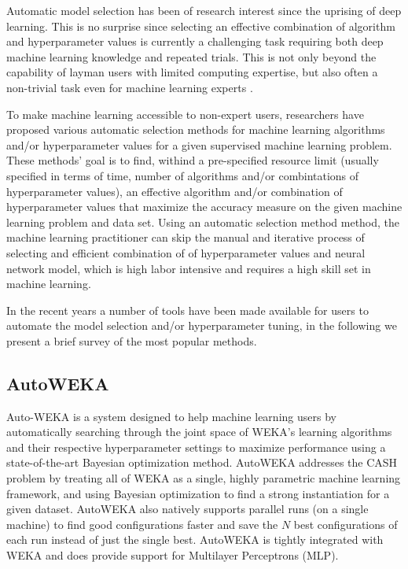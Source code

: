 \documentclass{article}
\begin{document}
Automatic model selection has been of research interest since the uprising of deep learning. This is no surprise since selecting an effective combination of algorithm and hyperparameter values is currently a challenging task requiring both deep machine learning knowledge and repeated trials. This is not only beyond the capability of layman users with limited computing expertise, but also often a non-trivial task even for machine learning experts \cite{sparks2015}. 

To make machine learning accessible to non-expert users, researchers have proposed various automatic selection methods for machine learning algorithms and/or hyperparameter values for a given supervised machine learning problem. These methods' goal is to find, withind a pre-specified resource limit (usually specified in terms of time, number of algorithms and/or combintations of hyperparameter values), an effective algorithm and/or combination of hyperparameter values that maximize the accuracy measure on the given machine learning problem and data set. Using an automatic selection method method, the machine learning practitioner can skip the manual and iterative process of selecting and efficient combination of of hyperparameter values and neural network model, which is high labor intensive and requires a high skill set in machine learning.

In the recent years a number of tools have been made available for users to automate the model selection and/or hyperparameter tuning, in the following we present a brief survey of the most popular methods.

\subsection{AutoWEKA}

Auto-WEKA \cite{Thornton2016} is a system designed to help machine learning users by automatically searching through the joint space of WEKA's learning algorithms and their respective hyperparameter settings to maximize performance using a state-of-the-art Bayesian optimization method. AutoWEKA addresses the CASH problem by treating all of WEKA as a single, highly parametric machine learning framework, and using Bayesian optimization to find a strong instantiation for a given dataset. AutoWEKA also natively supports parallel runs (on a single machine) to find good configurations faster and save the $N$ best configurations of each run instead of just the single best. AutoWEKA is tightly integrated with WEKA and does provide support for Multilayer Perceptrons (MLP).
\end{document}
